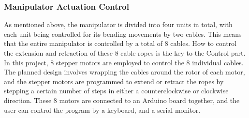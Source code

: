 \subsubsection{Manipulator Actuation Control}
As mentioned above, the manipulator is divided into four units in total, with each unit being controlled for its 
bending movements by two cables. This means that the entire manipulator is controlled by a total of 8 cables. How 
to control the extension and retraction of these 8 cable ropes is the key to the Control part. \\
In this project, 8 stepper motors are employed to control the 8 individual cables. The planned design involves 
wrapping the cables around the rotor of each motor, and the stepper motors are programmed to extend or retract 
the ropes by stepping a certain number of steps in either a counterclockwise or clockwise direction. These 8 motors 
are connected to an Arduino board together, and the user can control the program by a keyboard, and a serial monitor. \\
